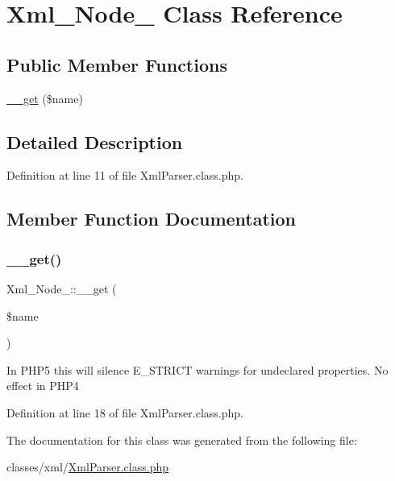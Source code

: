 \hypertarget{classXml__Node__}{}\section{Xml\+\_\+\+Node\+\_\+ Class Reference}
\label{classXml__Node__}
\subsection*{Public Member Functions}
\begin{DoxyCompactItemize}
\item 
\hyperlink{classXml__Node___a92b82fdfee7220d0438f98500ec10dc3}{\+\_\+\+\_\+get} (\$name)
\end{DoxyCompactItemize}


\subsection{Detailed Description}


Definition at line 11 of file Xml\+Parser.\+class.\+php.



\subsection{Member Function Documentation}
\mbox{\label{classXml__Node___a92b82fdfee7220d0438f98500ec10dc3}} 
\subsubsection{\texorpdfstring{\+\_\+\+\_\+get()}{\_\_get()}}
{\footnotesize\ttfamily Xml\+\_\+\+Node\+\_\+\+::\+\_\+\+\_\+get (\begin{DoxyParamCaption}\item[{}]{\$name }\end{DoxyParamCaption})}

In P\+H\+P5 this will silence E\+\_\+\+S\+T\+R\+I\+CT warnings for undeclared properties. No effect in P\+H\+P4 

Definition at line 18 of file Xml\+Parser.\+class.\+php.



The documentation for this class was generated from the following file\+:\begin{DoxyCompactItemize}
\item 
classes/xml/\hyperlink{XmlParser_8class_8php}{Xml\+Parser.\+class.\+php}\end{DoxyCompactItemize}

